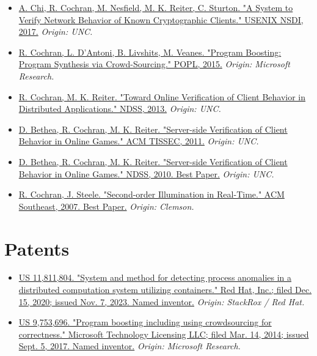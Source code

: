 \documentclass[10pt,letterpaper]{article}
\begin{document}
\begin{itemize}

  \item \href{https://www.usenix.org/conference/nsdi17/technical-sessions/presentation/chi}{A. Chi, R. Cochran, M. Nesfield, M. K. Reiter, C. Sturton. "A System to Verify Network Behavior of Known Cryptographic Clients." USENIX NSDI, 2017.} \emph{Origin: UNC.}

  \item \href{https://www.microsoft.com/en-us/research/publication/program-boosting-program-synthesis-via-crowd-sourcing/}{R. Cochran, L. D'Antoni, B. Livshits, M. Veanes. "Program Boosting: Program Synthesis via Crowd-Sourcing." POPL, 2015.} \emph{Origin: Microsoft Research.}

  \item \href{https://www.ndss-symposium.org/ndss-2013-programme/toward-online-verification-client-behavior-distributed-applications/}{R. Cochran, M. K. Reiter. "Toward Online Verification of Client Behavior in Distributed Applications." NDSS, 2013.} \emph{Origin: UNC.}

  \item \href{https://doi.org/10.1145/2043628.2043633}{D. Bethea, R. Cochran, M. K. Reiter. "Server-side Verification of Client Behavior in Online Games." ACM TISSEC, 2011.} \emph{Origin: UNC.}

  \item \href{https://www.ndss-symposium.org/wp-content/uploads/2017/09/beth.pdf}{D. Bethea, R. Cochran, M. K. Reiter. "Server-side Verification of Client Behavior in Online Games." NDSS, 2010. Best Paper.} \emph{Origin: UNC.}

  \item \href{https://www.robbycochran.com/pdf/ACMSE07.pdf}{R. Cochran, J. Steele. "Second-order Illumination in Real-Time." ACM Southeast, 2007. Best Paper.} \emph{Origin: Clemson.}

\end{itemize}

\section*{Patents}

\begin{itemize}

  \item \href{https://patents.justia.com/patent/11811804}{US 11,811,804. "System and method for detecting process anomalies in a distributed computation system utilizing containers." Red Hat, Inc.; filed Dec. 15, 2020; issued Nov. 7, 2023. Named inventor.} \emph{Origin: StackRox / Red Hat.}

  \item \href{https://patents.google.com/patent/US9753696B2}{US 9,753,696. "Program boosting including using crowdsourcing for correctness." Microsoft Technology Licensing LLC; filed Mar. 14, 2014; issued Sept. 5, 2017. Named inventor.} \emph{Origin: Microsoft Research.}

\end{itemize}
\end{document}
